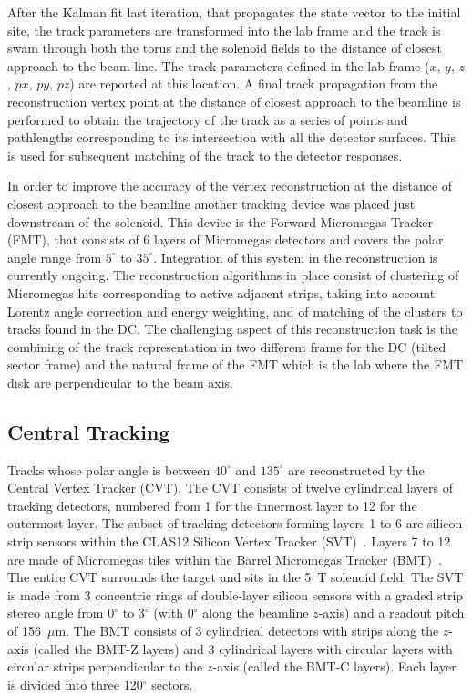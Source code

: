 After the Kalman fit last iteration, that propagates the state vector to the initial site, the track parameters are transformed into the lab frame and the track is swam through both the torus and the solenoid fields to the distance of closest approach to the beam line.  The track parameters defined in the lab frame ($x$, $y$, $z$, $px$, $py$, $pz$) are reported at this location.  A final track propagation from the reconstruction vertex point at the distance of closest approach to the beamline is performed to obtain the trajectory of the track as a series of points and pathlengths corresponding to its intersection with all the detector surfaces.  This is used for subsequent matching of the track to the detector responses.

In order to improve the accuracy of the vertex reconstruction at the distance of closest approach to the beamline another tracking device was placed just downstream of the solenoid.  This device is the Forward
Micromegas Tracker (FMT), that consists of 6 layers of Micromegas detectors and covers the polar angle range
from $5^\circ$ to $35^\circ$.  Integration of this system in the reconstruction is currently ongoing. 
The reconstruction algorithms in place consist of clustering of Micromegas hits corresponding to active adjacent strips, taking into account Lorentz angle correction and energy weighting, and of matching of the clusters to tracks found in the DC.  The challenging aspect of this reconstruction task is the combining of the track representation in two different frame for the DC (tilted sector frame) and the natural frame of the FMT which is the lab where the FMT disk are perpendicular to the beam axis. 

\subsection{Central Tracking}
\label{sec:cvt}

Tracks whose polar angle is between $40^\circ$ and $135^\circ$ are reconstructed by the Central Vertex Tracker
(CVT). The CVT consists of twelve cylindrical layers of tracking detectors, numbered from 1 for the innermost layer
to 12 for the outermost layer. The subset of tracking detectors forming layers 1 to 6 are silicon strip sensors within
the CLAS12 Silicon Vertex Tracker (SVT)~\cite{svt-nim}. Layers 7 to 12 are made of Micromegas tiles within the
Barrel Micromegas Tracker (BMT)~\cite{mm-nim}. The entire CVT surrounds the target and sits in the 5~T solenoid
field. The SVT is made from 3 concentric rings of double-layer silicon sensors with a graded strip stereo angle from
0$^\circ$ to 3$^\circ$ (with 0$^\circ$ along the beamline $z$-axis) and a readout pitch of 156~$\mu$m. The BMT
consists of 3 cylindrical detectors with strips along the $z$-axis (called the BMT-Z layers) and 3 cylindrical layers
with circular layers with circular strips perpendicular to the $z$-axis (called the BMT-C layers). Each layer is divided
into three 120$^\circ$ sectors.

